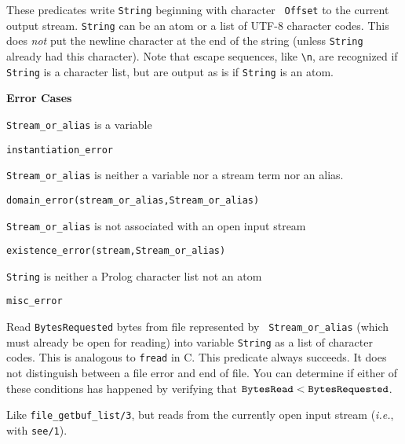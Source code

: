 \begin{description}
%
These predicates write {\tt String} beginning with character {\tt
  Offset} to the current output stream. {\tt String} can be an atom or
a list of UTF-8 character codes. This does \emph{not} put the newline
character at the end of the string (unless {\tt String} already had
this character). Note that escape sequences, like \verb|\n|, are
recognized if {\tt String} is a character list, but are output as is
if {\tt String} is an atom.

{\bf Error Cases}
\bi
\item 	{\tt Stream\_or\_alias} is a variable
\bi
\item {\tt instantiation\_error}
\ei
\item 	{\tt Stream\_or\_alias} is neither a variable nor a stream term nor an alias.
\bi
\item 	{\tt domain\_error(stream\_or\_alias,Stream\_or\_alias)}
\ei
\item 	{\tt Stream\_or\_alias} is not associated with an open input stream
\bi
\item 	{\tt existence\_error(stream,Stream\_or\_alias)}
\ei
\item {\tt String} is neither a Prolog character list not an atom
\bi
\item {\tt misc\_error}
\ei
\ei


Read {\tt BytesRequested} bytes from file represented by {\tt
Stream\_or\_alias} (which must already be open for reading) into
variable {\tt String} as a list of character codes. This is analogous
to {\tt fread} in C.  This predicate always succeeds. It does not
distinguish between a file error and end of file.  You can determine
if either of these conditions has happened by verifying that $\tt
BytesRead < BytesRequested$.

%
Like \verb|file_getbuf_list/3|, but reads from the currently open input stream
({\it i.e.}, with {\tt see/1}).




\end{description}
